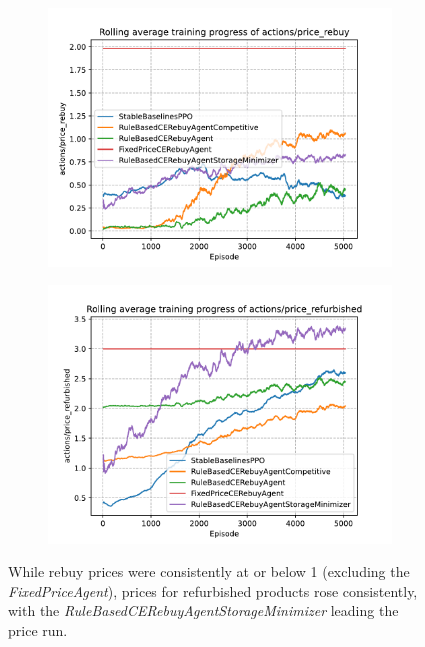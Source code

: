 \begin{figure}[ht]
	\centering
	\begin{subfigure}[t]{0.49\textwidth}
		\centering
		\includegraphics[width = \textwidth]{images/experiments/PPOOligopoly/PPOOligopolyLinePriceRebuy.pdf}\\
		\label{fig:PPOOligopolyLinePriceRebuy}
	\end{subfigure}
	\begin{subfigure}[t]{0.49\textwidth}
		\centering
		\includegraphics[width = \textwidth]{images/experiments/PPOOligopoly/PPOOligopolyLinePriceRefurbished.pdf}\\
		\label{fig:PPOOligopolyLinePriceRefurbished}
	\end{subfigure}
	\caption{While rebuy prices were consistently at or below 1 (excluding the \emph{FixedPriceAgent}), prices for refurbished products rose consistently, with the \emph{RuleBasedCERebuyAgentStorageMinimizer} leading the price run.}\label{fig:PPOOligopolyDiagramsPrices}
\end{figure}


